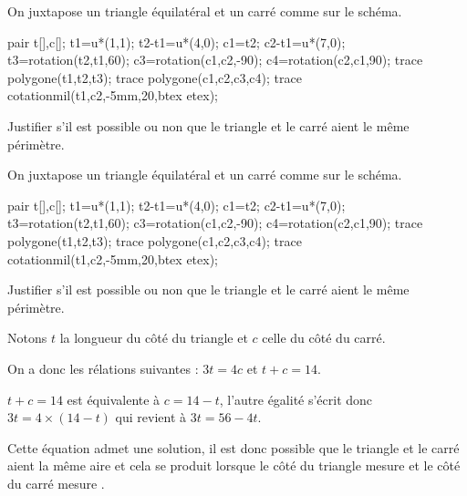 \begin{exercice*}
    On juxtapose un triangle équilatéral et un carré comme sur le schéma.

    \begin{Geometrie}
        pair t[],c[];
        t1=u*(1,1);
        t2-t1=u*(4,0);
        c1=t2;
        c2-t1=u*(7,0);
        t3=rotation(t2,t1,60);
        c3=rotation(c1,c2,-90);
        c4=rotation(c2,c1,90);
        trace polygone(t1,t2,t3);
        trace polygone(c1,c2,c3,c4);
        trace cotationmil(t1,c2,-5mm,20,btex  etex);
    \end{Geometrie}

    Justifier s'il est possible ou non que le triangle et le carré aient le même périmètre.
\end{exercice*}
\begin{corrige}
        On juxtapose un triangle équilatéral et un carré comme sur le schéma.

    \begin{Geometrie}
        pair t[],c[];
        t1=u*(1,1);
        t2-t1=u*(4,0);
        c1=t2;
        c2-t1=u*(7,0);
        t3=rotation(t2,t1,60);
        c3=rotation(c1,c2,-90);
        c4=rotation(c2,c1,90);
        trace polygone(t1,t2,t3);
        trace polygone(c1,c2,c3,c4);
        trace cotationmil(t1,c2,-5mm,20,btex  etex);
    \end{Geometrie}

    Justifier s'il est possible ou non que le triangle et le carré aient le même périmètre.

    {\color{red} Notons $t$ la longueur du côté du triangle et $c$ celle du côté du carré.

    On a donc les rélations suivantes : $3t=4c$ et $t+c=14$.

    $t+c=14$ est équivalente à $c=14-t$, l'autre égalité s'écrit donc $3t=4\times(14-t)$ qui revient à $3t=56-4t$.


    Cette équation admet une solution, il est donc possible que le triangle et le carré aient la même aire et cela
    se produit lorsque le côté du triangle mesure  et le côté du carré mesure .
    }
\end{corrige}

